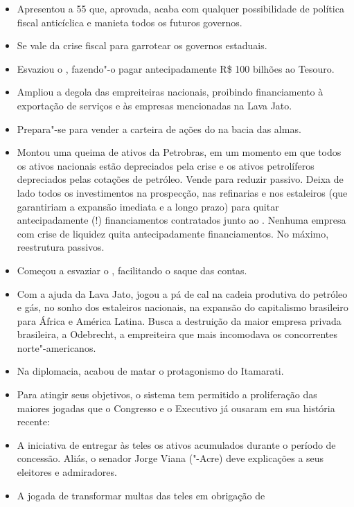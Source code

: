 \begin{itemize}
\itemsep1pt\parskip0pt
\item
   Apresentou a  55 que, aprovada, acaba com qualquer
  possibilidade de política fiscal anticíclica e manieta todos os
  futuros governos.
\item
   Se vale da crise fiscal para garrotear os governos estaduais.
\item
   Esvaziou o , fazendo"-o pagar antecipadamente R\$ 100
  bilhões ao Tesouro.
\item
   Ampliou a degola das empreiteiras nacionais, proibindo
  financiamento à exportação de serviços e às empresas mencionadas na
  Lava Jato.
\item
   Prepara"-se para vender a carteira de ações do  na bacia das
  almas.
\item
   Montou uma queima de ativos da Petrobras, em um momento em que
  todos os ativos nacionais estão depreciados pela crise e os ativos
  petrolíferos depreciados pelas cotações de petróleo. Vende para
  reduzir passivo. Deixa de lado todos os investimentos na prospecção,
  nas refinarias e nos estaleiros (que garantiriam a expansão imediata e
  a longo prazo) para quitar antecipadamente (!) financiamentos
  contratados junto ao . Nenhuma empresa com crise de liquidez
  quita antecipadamente financiamentos. No máximo, reestrutura passivos.
\item
   Começou a esvaziar o , facilitando o saque das contas.
\item
   Com a ajuda da Lava Jato, jogou a pá de cal na cadeia produtiva
  do petróleo e gás, no sonho dos estaleiros nacionais, na expansão do
  capitalismo brasileiro para África e América Latina. Busca a
  destruição da maior empresa privada brasileira, a Odebrecht, a
  empreiteira que mais incomodava os concorrentes norte"-americanos.
\item
   Na diplomacia, acabou de matar o protagonismo do Itamarati.
\item
  Para atingir seus objetivos, o sistema tem permitido a proliferação
  das maiores jogadas que o Congresso e o Executivo já ousaram em sua
  história recente:
\item
   A iniciativa de entregar às teles os ativos acumulados durante o
  período de concessão. Aliás, o senador Jorge Viana ("-Acre) deve
  explicações a seus eleitores e admiradores.
\item
   A jogada de transformar multas das teles em obrigação de

\end{itemize}
